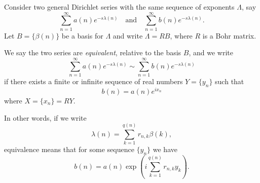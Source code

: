 Consider two general Dirichlet series with the same sequence of exponents $\Lambda$, say
$$\sum_{n=1}^{\infty} a(n)e^{-s\lambda(n)} \quad \text{and} \quad \sum_{n=1}^{\infty} b(n)e^{-s\lambda(n)}.$$
Let $B = \{\beta(n)\}$ be a basis for $\Lambda$ and write $\Lambda = RB$, where $R$ is a Bohr matrix.

We say the two series are \textit{equivalent}, relative to the basis $B$, and we write
$$\sum_{n=1}^{\infty} a(n)e^{-s\lambda(n)} \sim \sum_{n=1}^{\infty} b(n)e^{-s\lambda(n)}$$
if there exists a finite or infinite sequence of real numbers $Y = \{y_n\}$ such that
$$b(n) = a(n)e^{ix_n}$$
where $X = \{x_n\} = RY$.

In other words, if we write
$$\lambda(n) = \sum_{k=1}^{q(n)} r_{n,k}\beta(k),$$
equivalence means that for some sequence $\{y_n\}$ we have
$$b(n) = a(n) \exp\left(i \sum_{k=1}^{q(n)} r_{n,k}y_k\right).$$
